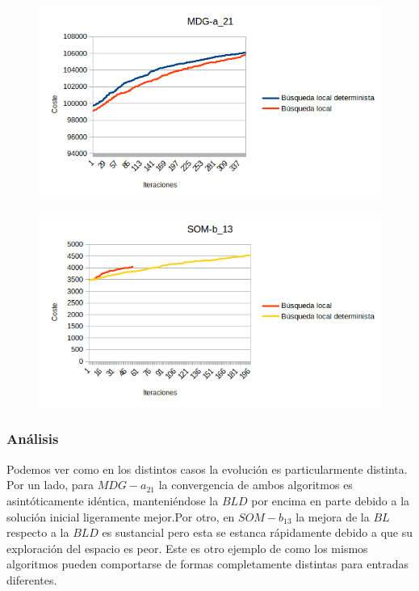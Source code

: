 \documentclass[11pt,a4paper]{article}
\begin{document}
	\begin{figure}[H] 
		\centering
		\includegraphics[scale=1]{../output/evolution/MDG-a_21}
	\end{figure}
	
	\begin{figure}[H] 
		\centering
		\includegraphics[scale=1]{../output/evolution/SOM-b_13}%
	\end{figure}

	\subsubsection{ Análisis }
	
	Podemos ver como en los distintos casos la evolución es particularmente distinta. Por un lado, para $MDG-a_21$ la convergencia de ambos algoritmos es asintóticamente idéntica, manteniéndose la $BLD$ por encima en parte debido a la solución inicial ligeramente mejor.Por otro, en $SOM-b_13$ la mejora de la $BL$ respecto a la $BLD$ es sustancial pero esta se estanca rápidamente debido a que su exploración del espacio es peor. Este es otro ejemplo de como los mismos algoritmos pueden comportarse de formas completamente distintas para entradas diferentes.
\end{document}
